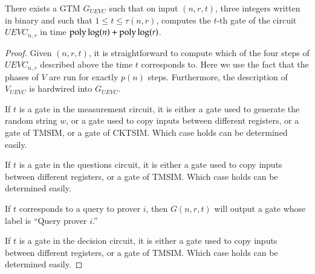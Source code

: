 \begin{lemma}
	There exists a GTM $G_{UEVC}$ such that on input $(n,r,t)$, three integers written in binary and such that $1 \leq t \leq \tau(n,r)$, computes the $t$-th gate of the circuit $UEVC_{n,r}$ in time $\operatorname{poly}\log(n) + \operatorname{poly} \log(r)$.
\end{lemma}

\begin{proof}
	Given $(n,r,t)$, it is straightforward to compute which of the four steps of $UEVC_{n,r}$ described above the time $t$ corresponds to. Here we use the fact that the phases of $V$ are run for exactly $p(n)$ steps. Furthermore, the description of $V_{UEVC}$ is hardwired into $G_{UEVC}$.
	
	If $t$ is a gate in the measurement circuit, it is either a gate used to generate the random string $w$, or a gate used to copy inputs between different registers, or a gate of TMSIM, or a gate of CKTSIM. Which case holds can be determined easily.
	
	If $t$ is a gate in the questions circuit, it is either a gate used to copy inputs between different registers, or a gate of TMSIM. Which case holds can be determined easily.
	
	If $t$ corresponds to a query to prover $i$, then $G(n,r,t)$ will output a gate whose label is ``Query prover $i$.'' 
	
	If $t$ is a gate in the decision circuit, it is either a gate used to copy inputs between different registers, or a gate of TMSIM. Which case holds can be determined easily.
	

\end{proof}
